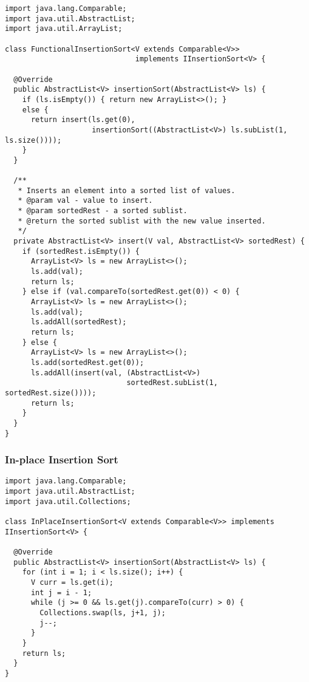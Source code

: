 \begin{lstlisting}[language=MyJava]
import java.lang.Comparable;
import java.util.AbstractList;
import java.util.ArrayList;

class FunctionalInsertionSort<V extends Comparable<V>> 
                              implements IInsertionSort<V> {
  
  @Override
  public AbstractList<V> insertionSort(AbstractList<V> ls) {
    if (ls.isEmpty()) { return new ArrayList<>(); }
    else { 
      return insert(ls.get(0), 
                    insertionSort((AbstractList<V>) ls.subList(1, ls.size()))); 
    }
  }

  /**
   * Inserts an element into a sorted list of values.
   * @param val - value to insert.
   * @param sortedRest - a sorted sublist.
   * @return the sorted sublist with the new value inserted.
   */
  private AbstractList<V> insert(V val, AbstractList<V> sortedRest) {
    if (sortedRest.isEmpty()) {
      ArrayList<V> ls = new ArrayList<>();
      ls.add(val);
      return ls;
    } else if (val.compareTo(sortedRest.get(0)) < 0) {
      ArrayList<V> ls = new ArrayList<>();
      ls.add(val);
      ls.addAll(sortedRest);
      return ls;
    } else {
      ArrayList<V> ls = new ArrayList<>();
      ls.add(sortedRest.get(0));
      ls.addAll(insert(val, (AbstractList<V>) 
                            sortedRest.subList(1, sortedRest.size())));
      return ls;
    }
  }
}
\end{lstlisting}

\subsubsection*{In-place Insertion Sort}
\begin{lstlisting}[language=MyJava]
import java.lang.Comparable;
import java.util.AbstractList;
import java.util.Collections;

class InPlaceInsertionSort<V extends Comparable<V>> implements IInsertionSort<V> {

  @Override
  public AbstractList<V> insertionSort(AbstractList<V> ls) {
    for (int i = 1; i < ls.size(); i++) {
      V curr = ls.get(i);
      int j = i - 1;
      while (j >= 0 && ls.get(j).compareTo(curr) > 0) {
        Collections.swap(ls, j+1, j);
        j--;
      }
    }
    return ls;
  }
}
\end{lstlisting}

